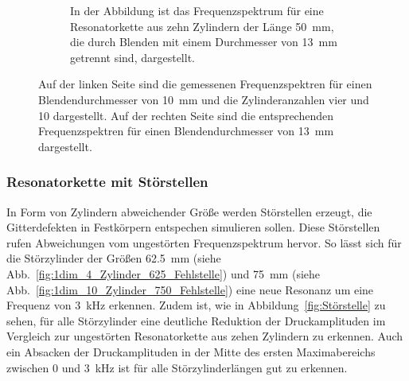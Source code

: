 \begin{figure}
\begin{subfigure}[b]{0.45\textwidth}
                    \caption{In der Abbildung ist das Frequenzspektrum für eine Resonatorkette aus zehn Zylindern der Länge \SI{50}{\milli\metre}, die durch Blenden mit einem Durchmesser von \SI{13}{\milli\metre} getrennt sind, dargestellt.}
                    \label{fig:1dim_10_Zylinder_13mm}
                \end{subfigure}
                \caption{Auf der linken Seite sind die gemessenen Frequenzspektren für einen Blendendurchmesser von \SI{10}{\milli\metre} und die Zylinderanzahlen vier und 10 dargestellt. Auf der rechten Seite sind die entsprechenden Frequenzspektren für einen Blendendurchmesser von \SI{13}{\milli\metre} dargestellt.}
                \label{10mm_16mm_blende2}
            \end{figure}
            \FloatBarrier


        \subsubsection*{Resonatorkette mit Störstellen}
            In Form von Zylindern abweichender Größe werden Störstellen erzeugt, die Gitterdefekten in Festkörpern entspechen simulieren sollen. Diese Störstellen rufen Abweichungen vom ungestörten 
            Frequenzspektrum hervor. So lässt sich für die Störzylinder der Größen \SI{62.5}{\milli\metre} (siehe Abb.~\ref{fig:1dim_4_Zylinder_625_Fehlstelle}) und 
            \SI{75}{\milli\metre} (siehe Abb.~\ref{fig:1dim_10_Zylinder_750_Fehlstelle}) eine neue Resonanz um eine Frequenz von \SI{3}{\kilo\hertz} erkennen. Zudem ist, wie in Abbildung~\ref{fig:Störstelle} zu sehen, für 
            alle Störzylinder eine deutliche Reduktion der Druckamplituden im Vergleich zur ungestörten Resonatorkette aus zehen Zylindern zu erkennen. Auch ein Absacken der Druckamplituden in der Mitte des 
            ersten Maximabereichs zwischen 0 und \SI{3}{\kilo\hertz} ist für alle Störzylinderlängen gut zu erkennen.
            \FloatBarrier
